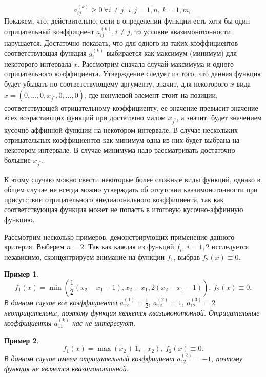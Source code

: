 \documentclass{article}
\renewcommand{\ge}{\geqslant}
\newtheorem{example}{Пример}
\theoremstyle{definition}
\begin{document}
\begin{equation} \label{qmmm}
	a_{ij}^{(k)} \ge 0\ \forall i \neq j,\ i,j = \overline{1, n},\ k = \overline{1, m_i}.
\end{equation}
Покажем, что, действительно, если в определении функции есть хотя бы один отрицательный коэффициент \(a_{ij}^{(k)}, i \neq j\), то условие квазимонотонности нарушается. Достаточно показать, что для одного из таких коэффициентов соответствующая функция \(g_i^{(k)}\) выбирается как максимум (минимум) для некоторого интервала \(x\). Рассмотрим сначала случай максимума и одного отрицательного коэффициента. Утверждение следует из того, что данная функция будет убывать по соответствующему аргументу, значит, для некоторого \(x\) вида \(x = (0,\dots,0,x_{j^*},0,\dots,0)\), где ненулевой элемент стоит на позиции, соответствующей отрицательному коэффициенту, ее значение превысит значение всех возрастающих функций при достаточно малом \(x_{j^*}\), а значит, будет значением кусочно-аффинной функции на некотором интервале. В случае нескольких отрицательных коэффициентов как минимум одна из них будет выбрана на некотором интервале. В случае минимума надо рассматривать достаточно большие \(x_{j^*}\).

К этому случаю можно свести некоторые более сложные виды функций, однако в общем случае не всегда можно утверждать об отсутсвии квазимонотонности при присутствии отрицательного внедиагонального коэффициента, так как соответствующая функция может не попасть в итоговую кусочно-аффинную функцию.

Рассмотрим несколько примеров, демонстрирующих применение данного критерия. Выберем \(n = 2\). Так как каждая из функций \(f_i,\ i = \overline{1, 2}\) исследуется независимо, сконцентрируем внимание на функции \(f_1\), выбрав \(f_2(x) \equiv 0\).
\begin{example}
	\[f_1(x) = \min(\frac{1}{2}(x_2 - x_1 - 1), x_2 - x_1, 2(x_2 - x_1 - 1)),\ f_2(x) \equiv 0.\]
	В данном случае все коэффициенты \(a_{12}^{(1)} = \frac{1}{2},\ a_{12}^{(2)} = 1,\ a_{12}^{(3)} = 2\) неотрицательны, поэтому функция является квазимонотонной. Отрицательные коэффициенты \(a_{11}^{(k)}\) нас не интересуют.
\end{example}
\begin{example} \label{exnotqm}
	\[f_1(x) = \max(x_2 + 1, -x_2),\ f_2(x) \equiv 0.\]
	В данном случае имеем отрицательный коэффициент \(a_{12}^{(2)} = -1\), поэтому функция не является квазимонотонной.
\end{example}
\end{document}
